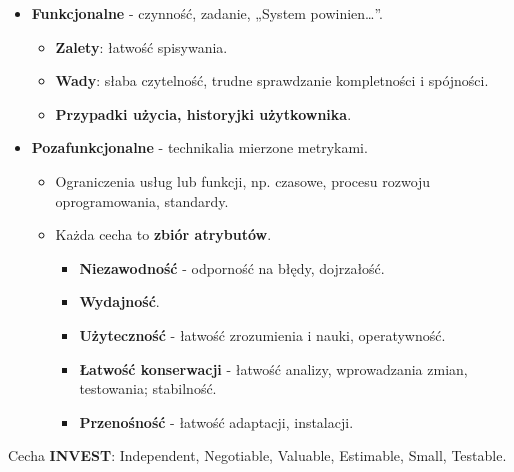\documentclass[a4paper]{article}
\begin{document}
    \begin{itemize}
        \item \textbf{Funkcjonalne} - czynność, zadanie, „System powinien\dots”.
        \begin{itemize}
            \item \textbf{Zalety}: łatwość spisywania.
            \item \textbf{Wady}: słaba czytelność, trudne sprawdzanie kompletności i spójności.
            \item \textbf{Przypadki użycia, historyjki użytkownika}.
        \end{itemize}
        \item \textbf{Pozafunkcjonalne} - technikalia mierzone metrykami.
        \begin{itemize}
            \item Ograniczenia usług lub funkcji, np. czasowe, procesu rozwoju oprogramowania, standardy.
            \item Każda cecha to \textbf{zbiór atrybutów}.
            \begin{itemize}
                \item \textbf{Niezawodność} - odporność na błędy, dojrzałość.
                \item \textbf{Wydajność}.
                \item \textbf{Użyteczność} - łatwość zrozumienia i nauki, operatywność.
                \item \textbf{Łatwość konserwacji} - łatwość analizy, wprowadzania zmian, testowania; stabilność.
                \item \textbf{Przenośność} - łatwość adaptacji, instalacji.
            \end{itemize}
        \end{itemize}
    \end{itemize}

    Cecha \textbf{INVEST}: Independent, Negotiable, Valuable, Estimable, Small, Testable.
\end{document}
